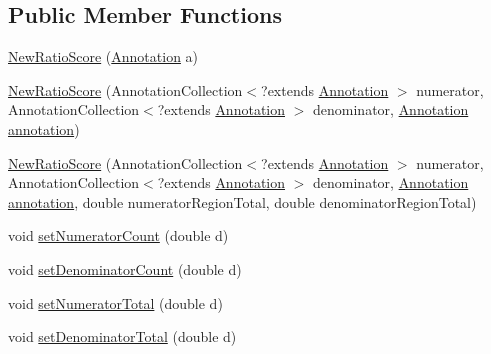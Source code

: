 \subsection*{Public Member Functions}
\begin{DoxyCompactItemize}
\item 
\hyperlink{classumms_1_1core_1_1model_1_1score_1_1_new_ratio_score_abe5c729dc5737338079cfc408469527c}{New\+Ratio\+Score} (\hyperlink{interfaceumms_1_1core_1_1annotation_1_1_annotation}{Annotation} a)
\item 
\hyperlink{classumms_1_1core_1_1model_1_1score_1_1_new_ratio_score_a83993d531991259236168b39fdace95e}{New\+Ratio\+Score} (Annotation\+Collection$<$?extends \hyperlink{interfaceumms_1_1core_1_1annotation_1_1_annotation}{Annotation} $>$ numerator, Annotation\+Collection$<$?extends \hyperlink{interfaceumms_1_1core_1_1annotation_1_1_annotation}{Annotation} $>$ denominator, \hyperlink{interfaceumms_1_1core_1_1annotation_1_1_annotation}{Annotation} \hyperlink{classumms_1_1core_1_1model_1_1score_1_1_window_score_1_1_abstract_window_score_a455fb02f18f492e611113b9da0a24888}{annotation})
\item 
\hyperlink{classumms_1_1core_1_1model_1_1score_1_1_new_ratio_score_aff56900f9c2118c6625cdc56ad3d35cb}{New\+Ratio\+Score} (Annotation\+Collection$<$?extends \hyperlink{interfaceumms_1_1core_1_1annotation_1_1_annotation}{Annotation} $>$ numerator, Annotation\+Collection$<$?extends \hyperlink{interfaceumms_1_1core_1_1annotation_1_1_annotation}{Annotation} $>$ denominator, \hyperlink{interfaceumms_1_1core_1_1annotation_1_1_annotation}{Annotation} \hyperlink{classumms_1_1core_1_1model_1_1score_1_1_window_score_1_1_abstract_window_score_a455fb02f18f492e611113b9da0a24888}{annotation}, double numerator\+Region\+Total, double denominator\+Region\+Total)
\item 
void \hyperlink{classumms_1_1core_1_1model_1_1score_1_1_new_ratio_score_afe4d4a09361e2f703314d8d905e55a8e}{set\+Numerator\+Count} (double d)
\item 
void \hyperlink{classumms_1_1core_1_1model_1_1score_1_1_new_ratio_score_a3d8c6cb4683ab5f88e8e9a36ddfd368f}{set\+Denominator\+Count} (double d)
\item 
void \hyperlink{classumms_1_1core_1_1model_1_1score_1_1_new_ratio_score_ab9a973e024d4a60f7d6fe914de852252}{set\+Numerator\+Total} (double d)
\item 
void \hyperlink{classumms_1_1core_1_1model_1_1score_1_1_new_ratio_score_a4ce8d20f5b775f7c805367c75e56dda1}{set\+Denominator\+Total} (double d)

\end{DoxyCompactItemize}
